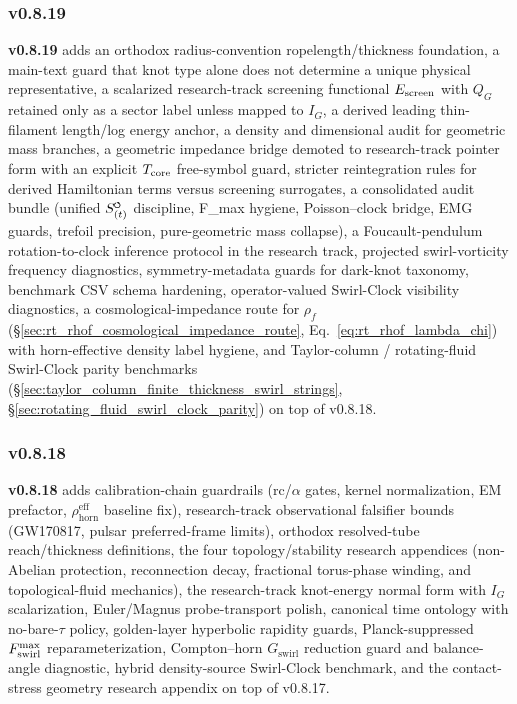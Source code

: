 \documentclass[11pt]{article}
\theoremstyle{definition}
\theoremstyle{plain}
\theoremstyle{remark}
\newcommand{\swirlarrow}{\mathchoice{\mkern-2mu\scriptstyle\boldsymbol{\circlearrowleft}}{\mkern-2mu\scriptstyle\boldsymbol{\circlearrowleft}}{\mkern-2mu\scriptscriptstyle\boldsymbol{\circlearrowleft}}{\mkern-2mu\scriptscriptstyle\boldsymbol{\circlearrowleft}}}
\newcommand{\rhohorn}{\rho_{\mathrm{horn}}^{\mathrm{eff}}}
\newcommand{\SwirlClock}{{S_{(t)}^{\swirlarrow}}}
\begin{document}
        \subsubsection{v0.8.19}
            \textbf{v0.8.19} adds an orthodox radius-convention ropelength/thickness foundation, a main-text guard that knot type alone does not determine a unique physical representative, a scalarized research-track screening functional \(E_{\rm screen}\) with \(Q_G\) retained only as a sector label unless mapped to \(I_G\), a derived leading thin-filament length/log energy anchor, a density and dimensional audit for geometric mass branches, a geometric impedance bridge demoted to research-track pointer form with an explicit \(T_{\rm core}\) free-symbol guard, stricter reintegration rules for derived Hamiltonian terms versus screening surrogates, a consolidated audit bundle (unified \(\SwirlClock\) discipline, F\_max hygiene, Poisson--clock bridge, EMG guards, trefoil precision, pure-geometric mass collapse), a Foucault-pendulum rotation-to-clock inference protocol in the research track, projected swirl-vorticity frequency diagnostics, symmetry-metadata guards for dark-knot taxonomy, benchmark CSV schema hardening, operator-valued Swirl-Clock visibility diagnostics, a cosmological-impedance route for \(\rho_f\) (\S\ref{sec:rt_rhof_cosmological_impedance_route}, Eq.~\ref{eq:rt_rhof_lambda_chi}) with horn-effective density label hygiene, and Taylor-column / rotating-fluid Swirl-Clock parity benchmarks (\S\ref{sec:taylor_column_finite_thickness_swirl_strings}, \S\ref{sec:rotating_fluid_swirl_clock_parity}) on top of v0.8.18.

        \subsubsection{v0.8.18}
            \textbf{v0.8.18} adds calibration-chain guardrails (rc/$\alpha$ gates, kernel normalization, EM prefactor, $\rhohorn$ baseline fix), research-track observational falsifier bounds (GW170817, pulsar preferred-frame limits), orthodox resolved-tube reach/thickness definitions, the four topology/stability research appendices (non-Abelian protection, reconnection decay, fractional torus-phase winding, and topological-fluid mechanics), the research-track knot-energy normal form with $I_G$ scalarization, Euler/Magnus probe-transport polish, canonical time ontology with no-bare-$\tau$ policy, golden-layer hyperbolic rapidity guards, Planck-suppressed $F_{\rm swirl}^{\max}$ reparameterization, Compton--horn $G_{\mathrm{swirl}}$ reduction guard and balance-angle diagnostic, hybrid density-source Swirl-Clock benchmark, and the contact-stress geometry research appendix on top of v0.8.17.
\end{document}
